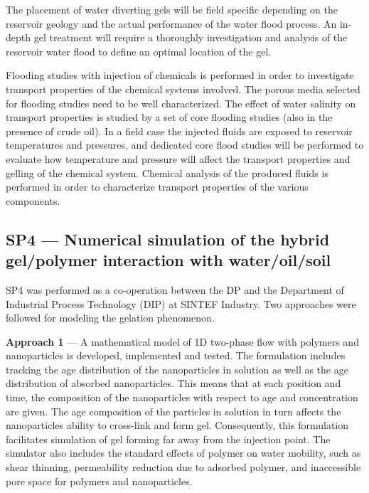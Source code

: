 The placement of water diverting gels will be field specific depending on the reservoir geology and the actual performance of the water flood process. An in-depth gel treatment will require a thoroughly investigation and analysis of the reservoir water flood to define an optimal location of the gel. 

Flooding studies with injection of chemicals is performed in order to investigate transport properties of the chemical systems involved. The porous media selected for flooding studies need to be well characterized. The effect of water salinity on transport properties is studied by a set of core flooding studies (also in the presence of crude oil). In a field case the injected fluids are exposed to reservoir temperatures and pressures, and dedicated core flood studies will be performed to evaluate how temperature and pressure will affect the transport properties and gelling of the chemical system. Chemical analysis of the produced fluids is performed in order to characterize transport properties of the various components.

\subsection*{SP4 --- Numerical simulation of the hybrid gel/polymer interaction with water/oil/soil}
%

SP4 was performed as a co-operation between the DP and the Department of Industrial Process Technology (DIP) at SINTEF Industry. Two approaches were followed for modeling the gelation phenomenon. 

\textbf{Approach 1} --- \label{ref:sp4app1} A mathematical model  of 1D two-phase flow with polymers and nanoparticles is developed, implemented and tested. The formulation includes tracking the age distribution of the nanoparticles in solution as well as the age distribution of absorbed nanoparticles. This means that at each position and time, the composition of the nanoparticles with respect to age and concentration are given. The age composition of the particles in solution in turn affects the nanoparticles ability to cross-link and form gel. Consequently, this formulation facilitates simulation of gel forming far away from the injection point. The simulator also includes the standard effects of polymer on water mobility, such as shear thinning, permeability reduction due to adsorbed polymer, and inaccessible pore space for polymers and nanoparticles.

